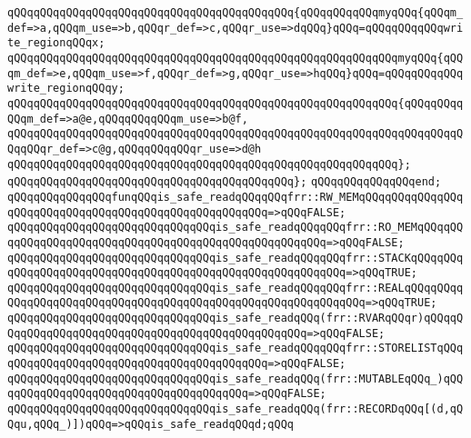 \verb|qQQqqQQqqQQqqQQqqQQqqQQqqQQqqQQqqQQqqQQqqQQq{qQQqqQQqqQQqmyqQQq{qQQqm_def=>a,qQQqm_use=>b,qQQqr_def=>c,qQQqr_use=>dqQQq}qQQq=qQQqqQQqqQQqwrite_regionqQQqx;|\newline
\verb|qQQqqQQqqQQqqQQqqQQqqQQqqQQqqQQqqQQqqQQqqQQqqQQqqQQqqQQqqQQqmyqQQq{qQQqm_def=>e,qQQqm_use=>f,qQQqr_def=>g,qQQqr_use=>hqQQq}qQQq=qQQqqQQqqQQqwrite_regionqQQqy;|\newline
\newline
\verb|qQQqqQQqqQQqqQQqqQQqqQQqqQQqqQQqqQQqqQQqqQQqqQQqqQQqqQQqqQQq{qQQqqQQqqQQqm_def=>a@e,qQQqqQQqqQQqm_use=>b@f,|\newline
\verb|qQQqqQQqqQQqqQQqqQQqqQQqqQQqqQQqqQQqqQQqqQQqqQQqqQQqqQQqqQQqqQQqqQQqqQQqqQQqr_def=>c@g,qQQqqQQqqQQqr_use=>d@h|\newline
\verb|qQQqqQQqqQQqqQQqqQQqqQQqqQQqqQQqqQQqqQQqqQQqqQQqqQQqqQQqqQQq};|\newline
\verb|qQQqqQQqqQQqqQQqqQQqqQQqqQQqqQQqqQQqqQQqqQQq};|\newline
\verb|qQQqqQQqqQQqqQQqend;|\newline
\newline
\verb|qQQqqQQqqQQqqQQqfunqQQqis_safe_readqQQqqQQqfrr::RW_MEMqQQqqQQqqQQqqQQqqQQqqQQqqQQqqQQqqQQqqQQqqQQqqQQqqQQqqQQq=>qQQqFALSE;|\newline
\verb|qQQqqQQqqQQqqQQqqQQqqQQqqQQqqQQqis_safe_readqQQqqQQqfrr::RO_MEMqQQqqQQqqQQqqQQqqQQqqQQqqQQqqQQqqQQqqQQqqQQqqQQqqQQqqQQq=>qQQqFALSE;|\newline
\verb|qQQqqQQqqQQqqQQqqQQqqQQqqQQqqQQqis_safe_readqQQqqQQqfrr::STACKqQQqqQQqqQQqqQQqqQQqqQQqqQQqqQQqqQQqqQQqqQQqqQQqqQQqqQQqqQQq=>qQQqTRUE;|\newline
\verb|qQQqqQQqqQQqqQQqqQQqqQQqqQQqqQQqis_safe_readqQQqqQQqfrr::REALqQQqqQQqqQQqqQQqqQQqqQQqqQQqqQQqqQQqqQQqqQQqqQQqqQQqqQQqqQQqqQQq=>qQQqTRUE;|\newline
\verb|qQQqqQQqqQQqqQQqqQQqqQQqqQQqqQQqis_safe_readqQQq(frr::RVARqQQqr)qQQqqQQqqQQqqQQqqQQqqQQqqQQqqQQqqQQqqQQqqQQqqQQqqQQq=>qQQqFALSE;|\newline
\verb|qQQqqQQqqQQqqQQqqQQqqQQqqQQqqQQqis_safe_readqQQqqQQqfrr::STORELISTqQQqqQQqqQQqqQQqqQQqqQQqqQQqqQQqqQQqqQQqqQQq=>qQQqFALSE;|\newline
\verb|qQQqqQQqqQQqqQQqqQQqqQQqqQQqqQQqis_safe_readqQQq(frr::MUTABLEqQQq_)qQQqqQQqqQQqqQQqqQQqqQQqqQQqqQQqqQQqqQQq=>qQQqFALSE;|\newline
\verb|qQQqqQQqqQQqqQQqqQQqqQQqqQQqqQQqis_safe_readqQQq(frr::RECORDqQQq[(d,qQQqu,qQQq_)])qQQq=>qQQqis_safe_readqQQqd;qQQq|\newline
